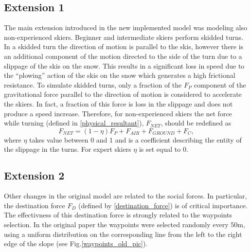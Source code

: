 \documentclass[12pt,a4paper,twoside]{book}
\begin{document}
\subsection{Extension 1}
The main extension introduced in the new implemented model was modeling also non-experienced skiers. Beginner and intermediate skiers perform skidded turns. In a skidded turn the direction of motion is parallel to the skis, however there is an additional component of the motion directed to the side of the turn due to a slippage of the skis on the snow. This results in a significant loss in speed due to the ``plowing'' action of the skis on the snow which generates a high frictional resistance. To simulate skidded turns, only a fraction of the $F_P$ component of the gravitational force parallel to the direction of motion is considered to accelerate the skiers. In fact, a fraction of this force is loss in the slippage and does not produce a speed increase. Therefore, for non-experienced skiers the net force while turning (defined in \ref{physical_resultant}), $F_{NET}$, should be redefined as
\begin{equation}
F_{NET}=(1-\eta) F_P + F_{AIR} + F_{GROUND} + F_C,
\end{equation}
where $\eta$ takes value between 0 and 1 and is a coefficient describing the entity of the slippage in the turns. For expert skiers $\eta$ is set equal to 0.

\subsection{Extension 2}
Other changes in the original model are related to the social forces. In particular, the destination force $F_D$ (defined by \ref{destination_force}) is of critical importance. The effectivness of this destination force is strongly related to the waypoints selection. In the original paper the waypoints were selected randomly every 50m, using a uniform distribution on the corresponding line from the left to the right edge of the slope (see Fig.\ref{waypoints_old_pic}).
\end{document}
